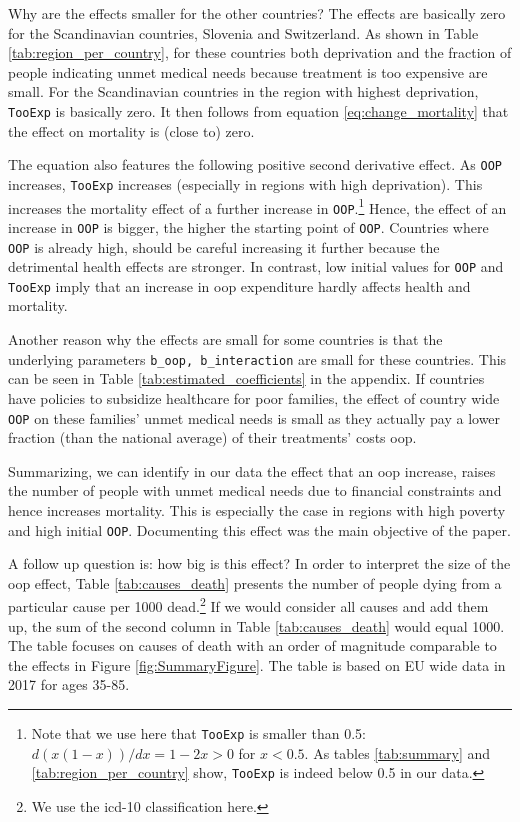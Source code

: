 \documentclass[a4paper,12pt]{article}
\begin{document}
Why are the effects smaller for the other countries? The effects are basically zero for the Scandinavian countries, Slovenia and Switzerland. As shown in Table \ref{tab:region_per_country}, for these countries both deprivation and the fraction of people indicating unmet medical needs because treatment is too expensive are small. For the Scandinavian countries in the region with highest deprivation, \texttt{TooExp} is basically zero. It then follows from equation \eqref{eq:change_mortality} that the effect on mortality is (close to) zero.

The equation also features the following positive second derivative effect. As \texttt{OOP} increases, \texttt{TooExp} increases (especially in regions with high deprivation). This increases the mortality effect of a further increase in \texttt{OOP}.\footnote{Note that we use here that \texttt{TooExp} is smaller than 0.5: \(d(x(1-x))/dx = 1-2x >0\) for \(x<0.5\). As tables \ref{tab:summary} and \ref{tab:region_per_country} show, \texttt{TooExp} is indeed below 0.5 in our data.} Hence, the effect of an increase in \texttt{OOP} is bigger, the higher the starting point of \texttt{OOP}. Countries where \texttt{OOP} is already high, should be careful increasing it further because the detrimental health effects are stronger. In contrast, low initial values for \texttt{OOP} and \texttt{TooExp} imply that an increase in oop expenditure hardly affects health and mortality.

Another reason why the effects are small for some countries is that the underlying parameters \texttt{b\_oop, b\_interaction} are small for these countries. This can be seen in Table \ref{tab:estimated_coefficients} in the appendix. If countries have policies to subsidize healthcare for poor families, the effect of country wide \texttt{OOP} on these families' unmet medical needs is small as they actually pay a lower fraction (than the national average) of their treatments' costs oop. 

Summarizing, we can identify in our data the effect that an oop increase, raises the number of people with unmet medical needs due to financial constraints and hence increases mortality. This is especially the case in regions with high poverty and high initial \texttt{OOP}. Documenting this effect was the main objective of the paper.

A follow up question is: how big is this effect? In order to interpret the size of the oop effect, Table \ref{tab:causes_death} presents the number of people dying from a particular cause per 1000 dead.\footnote{We use the icd-10 classification here.} If we would consider all causes and add them up, the sum of the second column in Table \ref{tab:causes_death} would equal 1000. The table focuses on causes of death with an order of magnitude comparable to the effects in Figure \ref{fig:SummaryFigure}. The table is based on EU wide data in 2017 for ages 35-85. 
\end{document}
